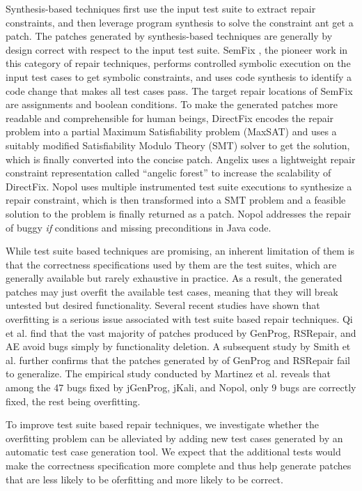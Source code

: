 \documentclass[]{sig-alternate}
\begin{document}
Synthesis-based techniques first use the input test suite to extract repair constraints, and then leverage program synthesis to solve the constraint ant get a patch. The patches generated by synthesis-based techniques are generally by design correct with respect to the input test suite.
SemFix \cite{semfix}, the pioneer work in this category of repair techniques, performs controlled symbolic execution on the input test cases to get symbolic constraints, and uses code synthesis to identify a code change that makes all test cases pass. The target repair locations of SemFix are assignments and boolean conditions. To make the generated patches more readable and comprehensible for human beings, DirectFix \cite{directfix} encodes the repair problem into a partial Maximum Satisfiability problem (MaxSAT) and uses a suitably modified Satisfiability Modulo Theory (SMT) solver to get the solution, which is finally converted into the concise patch. Angelix \cite{Mechtaev:2016:ASM:2884781.2884807} uses a lightweight repair constraint representation called “angelic forest” to increase the scalability of DirectFix. Nopol \cite{nopol} uses multiple instrumented test suite executions to synthesize a repair constraint, which is then transformed into a SMT problem and a feasible solution to the problem is finally returned as a patch. Nopol addresses the repair of buggy \emph{if} conditions and missing preconditions in Java code. 

While test suite based techniques are promising, an inherent limitation of them is that the correctness specifications used by
them are the test suites, which are generally available but rarely exhaustive in practice. As a result, the generated patches may just overfit the available test cases, meaning that they will break untested but desired functionality. Several recent studies have shown that overfitting is a serious issue associated with test suite based repair techniques.  Qi et al. \cite{qi2015analysis} find that the vast majority of patches produced by GenProg, RSRepair, and AE avoid bugs simply by functionality deletion. A subsequent study by Smith et al. \cite{smith2015cure} further confirms that the patches generated by of GenProg and RSRepair fail to generalize. The empirical study conducted by Martinez et al. \cite{defects4j-repair} reveals that among the 47 bugs fixed by jGenProg, jKali, and Nopol, only 9 bugs are correctly fixed, the rest being overfitting. 

To improve test suite based repair techniques, we investigate whether the overfitting problem can be alleviated by adding new test cases generated by an automatic test case generation tool.
We expect that the additional tests would make the correctness specification more complete and thus help generate patches that are less likely to be oferfitting and more likely to be correct. 
\end{document}
